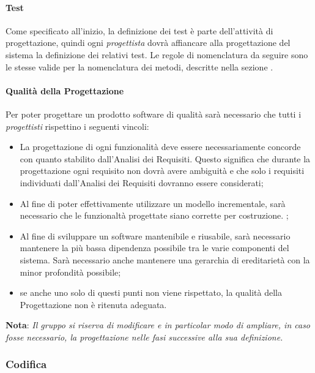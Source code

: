\paragraph{Test}

Come specificato all'inizio, la definizione dei test è parte dell'attività di progettazione, quindi ogni
\emph{progettista} dovrà affiancare alla progettazione del sistema la definizione dei relativi test. Le regole di
nomenclatura da seguire sono le stesse valide per la nomenclatura dei metodi, descritte nella sezione
.

\paragraph{Qualità della Progettazione}

Per poter progettare un prodotto software di qualità sarà necessario che tutti i \emph{progettisti} rispettino i
seguenti vincoli:
\begin{itemize}
    \item La progettazione di ogni funzionalità deve essere necessariamente concorde con quanto stabilito dall'Analisi
    dei Requisiti. Questo significa che durante la progettazione ogni requisito non dovrà avere ambiguità e che solo i
    requisiti individuati dall'Analisi dei Requisiti dovranno essere considerati;
    \item Al fine di poter effettivamente utilizzare un modello incrementale, sarà necessario che le funzionaltà
    progettate siano corrette per costruzione. ;
    \item Al fine di sviluppare un software mantenibile e riusabile, sarà necessario mantenere la più bassa dipendenza
    possibile tra le varie componenti del sistema. Sarà necessario anche mantenere una gerarchia di ereditarietà con la
    minor profondità possibile;
    \item se anche uno solo di questi punti non viene rispettato, la qualità della Progettazione non è ritenuta adeguata.
\end{itemize}

\begin{center}
    \textbf{Nota}: \emph{Il gruppo si riserva di modificare e in particolar modo di ampliare, in caso fosse
    necessario, la progettazione nelle fasi successive alla sua definizione.}
\end{center}

\subsubsection{Codifica}


